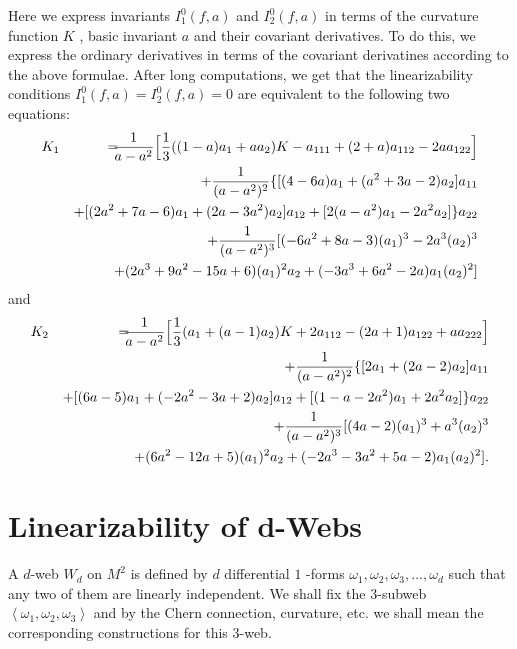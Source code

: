 \documentclass{article}
\begin{document}
Here we express invariants $I_{1}^{0}\left( f,a\right) $ and $%
I_{2}^{0}\left( f,a\right) $ in terms of the curvature function $K$ , basic
invariant $a$ and their covariant derivatives. To do this, we express the
ordinary derivatives in terms of the covariant derivatines according to the
above formulae. After long computations, we get that the linearizability
conditions $I_{1}^{0}\left( f,a\right) =I_{2}^{0}\left( f,a\right) =0$ are
equivalent to the following two equations:
\begin{eqnarray*}
K_{1} &&\!\!\!\!=\!\!\!\!\frac{1}{a-a^{2}}\Bigl[\frac{1}{3}%
((1-a)a_{1}+aa_{2})K-a_{111}+(2+a)a_{112}-2aa_{122}\Bigr] \\
&&+\frac{1}{(a-a^{2})^{2}}\{[(4-6a)a_{1}+(a^{2}+3a-2)a_{2}]a_{11} \\
&&+[(2a^{2}+7a-6)a_{1}+(2a-3a^{2})a_{2}]a_{12}+[2(a-a^{2})a_{1}-2a^{2}a_{2}]%
\}a_{22} \\
&&+\frac{1}{(a-a^{2})^{3}}[(-6a^{2}+8a-3)(a_{1})^{3}-2a^{3}(a_{2})^{3} \\
&&+(2a^{3}+9a^{2}-15a+6)(a_{1})^{2}a_{2}+(-3a^{3}+6a^{2}-2a)a_{1}(a_{2})^{2}]
\end{eqnarray*}%
and
\begin{eqnarray*}
K_{2} &&\!\!\!\!=\!\!\!\!\frac{1}{a-a^{2}}\Bigl[\frac{1}{3}%
(a_{1}+(a-1)a_{2})K+2a_{112}-(2a+1)a_{122}+aa_{222}\Bigr] \\
&&+\frac{1}{(a-a^{2})^{2}}\{[2a_{1}+(2a-2)a_{2}]a_{11} \\
&&+[(6a-5)a_{1}+(-2a^{2}-3a+2)a_{2}]a_{12}+[(1-a-2a^{2})a_{1}+2a^{2}a_{2}]%
\}a_{22} \\
&&+\frac{1}{(a-a^{2})^{3}}[(4a-2)(a_{1})^{3}+a^{3}(a_{2})^{3} \\
&&+(6a^{2}-12a+5)(a_{1})^{2}a_{2}+(-2a^{3}-3a^{2}+5a-2)a_{1}(a_{2})^{2}].
\end{eqnarray*}

\bigskip

\section{Linearizability of $\boldsymbol{d}$-Webs}

A $d$-web $W_{d}$ on $M^{2}$ is defined by $d$ differential \thinspace $1$%
-forms $\omega _{1},\omega _{2},\omega _{3},...,\omega _{d}$ such that any
two of them are linearly independent. We shall fix the $3$-subweb $%
\left\langle \omega _{1},\omega _{2},\omega _{3}\right\rangle $ and by the
Chern connection, curvature, etc. we shall mean the corresponding
constructions for this $3$-web$.$
\end{document}
